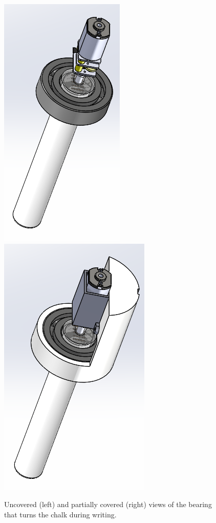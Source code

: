 \begin{figure}
 \centering
 	\includegraphics[width=0.48\columnwidth]{CAD-screen-shots/bearing.png}
 	\includegraphics[width=0.48\columnwidth]{CAD-screen-shots/bearing-holder.png}
	\caption{Uncovered (left) and partially covered (right) views of the bearing that turns the chalk during writing.}
 \label{fig:chalk-turner}
\end{figure}

